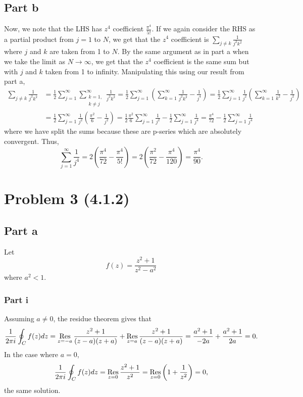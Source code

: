 \documentclass{article}
\begin{document}
\subsection{Part b}
Now, we note that the LHS has $z^4$ coefficient $\frac{\pi^4}{5!}$. If we again consider the RHS as a partial product from $j=1$ to $N$, we get that the $z^4$ coefficient is $\sum_{j\neq k}\frac{1}{j^2k^2}$ where $j$ and $k$ are taken from 1 to $N$. By the same argument as in part a when we take the limit as $N\to\infty$, we get that the $z^4$ coefficient is the same sum but with $j$ and $k$ taken from 1 to infinity. Manipulating this using our result from part a, 
\begin{align*}
\sum_{j\neq k}\frac{1}{j^2k^2}&=\frac{1}{2}\sum_{j=1}^{\infty}\sum_{\substack{k = 1,\\k\neq j}}^\infty\frac{1}{j^2k^2}=\frac{1}{2}\sum_{j=1}^{\infty}\left(\sum_{k=1}^\infty\frac{1}{j^2k^2}-\frac{1}{j^4}\right)=\frac{1}{2}\sum_{j=1}^{\infty}\frac{1}{j^2}\left(\sum_{k=1}^\infty\frac{1}{k^2}-\frac{1}{j^2}\right)\\&=
\frac{1}{2}\sum_{j=1}^{\infty}\frac{1}{j^2}\left(\frac{\pi^2}{6}-\frac{1}{j^2}\right)=\frac{1}{2}\frac{\pi^2}{6}\sum_{j=1}^{\infty}\frac{1}{j^2}-\frac{1}{2}\sum_{j=1}^{\infty}\frac{1}{j^4}=\frac{\pi^4}{72}-\frac{1}{2}\sum_{j=1}^{\infty}\frac{1}{j^4}
\end{align*}
where we have split the sums because these are p-series which are absolutely convergent. Thus,
\[
\sum_{j=1}^{\infty}\frac{1}{j^4}=2\left(\frac{\pi^4}{72}-\frac{\pi^4}{5!}\right)=2\left(\frac{\pi^2}{72}-\frac{\pi^4}{120}\right)=\frac{\pi^4}{90}.
\]

\section{Problem 3 (4.1.2)}
\subsection{Part a}
Let \[
f(z)=\frac{z^2 + 1}{z^2 - a^2}
\]
where $a^2 < 1$.
\subsubsection{Part i}
Assuming $a\neq0$, the residue theorem gives that 
\[
\frac{1}{2\pi i}\oint_Cf(z)dz=\operatorname*{Res}_{z=-a}\frac{z^2+1}{(z-a)(z+a)}+\operatorname*{Res}_{z=a}\frac{z^2+1}{(z-a)(z+a)}=\frac{a^2+1}{-2a}+\frac{a^2+1}{2a}=0.
\]
In the case where $a=0$, 
\[
\frac{1}{2\pi i}\oint_Cf(z)dz=\operatorname*{Res}_{z=0}\frac{z^2+1}{z^2}=\operatorname*{Res}_{z=0}\left(1+\frac{1}{z^2}\right)=0,
\]
the same solution. 
\end{document}
